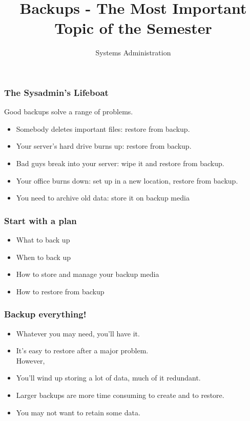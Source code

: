 \documentclass[10pt]{beamer}
\title{Backups - The Most Important Topic of the Semester}
\author[IN719]{Systems Administration}
\institute[Otago Polytechnic]{
  Otago Polytechnic \\
  Dunedin, New Zealand \\
}
\date{}
\begin{document}
\begin{frame}[plain]
  \titlepage
\end{frame}

\begin{frame}
  \frametitle{The Sysadmin's Lifeboat}
 
Good backups solve a range of problems.

\begin{itemize}
\item Somebody deletes important files:  restore from backup.
\item Your server's hard drive burns up:  restore from backup.
\item Bad guys break into your server:  wipe it and restore from backup.
\item Your office burns down: set up in a new location, restore from backup.
\item You need to archive old data: store it on backup media
\end{itemize}
\end{frame}


\begin{frame}
  \frametitle{Start with a plan}
 

\begin{itemize}
\item What to back up
\item When to back up
\item How to store and manage your backup media
\item How to restore from backup
\end{itemize}
\end{frame}

\begin{frame}
  \frametitle{Backup everything!}
 

\begin{itemize}
\item Whatever you may need, you'll have it.
\item It's easy to restore after a major problem. \\
       However,
\item You'll wind up storing a lot of data, much of it redundant.
\item Larger backups are more time consuming to create and to restore.
\item You may not want to retain some data.
\end{itemize}
\end{frame}
\end{document}
